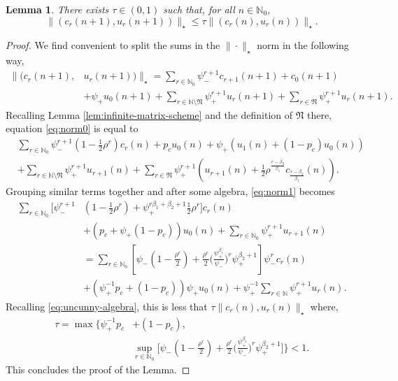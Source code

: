 \documentclass{amsart}
\numberwithin{equation}{section}
\newtheorem{lemma}[theorem]{Lemma}
\renewcommand{\le}{\leqslant}
\newcommand\bN{{\mathbb N}}
\begin{document}
\begin{lemma}\label{lem:contraction-strange-norm} There exists \(\tau \in (0,1)\) such that, for all \(n \in \bN_0\),
  \[
  \|(c_r(n+1), u_r(n+1))\|_{\star} \le \tau \|(c_r(n), u_r (n))\|_{\star}.
  \]
\end{lemma}
\begin{proof}
 We find convenient to split the sums in the \(\|\cdot\|_{\star}\) norm in the following way,
  \begin{equation}\label{eq:norm0}
\begin{split}
 \|(c_r(n+1),& u_r(n+1))\|_{\star} = \sum_{r \in \bN_0}\psi_-^{r+1} c_{r+1}(n+1) + c_0(n+1) \\
&+ \psi_+ u_0(n+1) + \sum_{r \in \bN \setminus \mathfrak N}\psi_+^{r+1}u_r(n+1) + \sum_{r \in \mathfrak N}\psi_+^{r+1}u_{r}(n+1).
\end{split}
\end{equation}
Recalling Lemma \ref{lem:infinite-matrix-scheme} and the definition of \(\mathfrak N\) there, equation \eqref{eq:norm0} is equal to
\begin{equation}\label{eq:norm1}
\begin{split}
&\sum_{r \in \bN_0}\psi_-^{r+1} \left(1- \frac 1 2\rho^{r}\right) c_r(n)  + p_c u_0(n) + \psi_+ \left( u_{1}(n) +(1-p_{c}) u_{0}(n) \right) \\
&+ \sum_{r \in \bN \setminus \mathfrak N}\psi_+^{r+1}u_{r+1}(n) + \sum_{r \in \mathfrak N}\psi_+^{r+1} \left(u_{r+1}(n) +  \frac 1 2\rho^{ \frac{r-\beta_2}{\beta_1}}c_{\frac{r-\beta_2}{\beta_1}}(n)\right).
\end{split}
\end{equation}
Grouping similar terms together and after some algebra, \eqref{eq:norm1} becomes
\begin{equation}
\begin{split}
\sum_{r \in \bN_0}\biggl[\psi_-^{r+1} &\left(1- \frac 1 2\rho^{r}\right)   + \psi_+^{r\beta_1 + \beta_2+1}  \frac 1 2\rho^{r} \biggr]c_r(n) \\
&+\left(p_c + \psi_+ (1-p_c)\right)u_0(n) + \sum_{r \in \bN_0}\psi_+^{r+1} u_{r+1}(n)\\
&\!\!\!\!\!\!\!\!\!\!\!\!\!\!\!\!\!\!\!\!\!\!\!\!\!\!\!\!\!\!\!\!\!=  \sum_{r \in \bN_0}\left[\psi_- \left(1-\frac{\rho^r}{2}\right) + \frac{\rho^r}{2}\biggl(\frac{\psi_{+}^{\beta_1}}{\psi_{-}} \biggr)^r \psi_{+}^{\beta_2 + 1}\right]\psi_{-}^r c_r(n)\\
& +\left(\psi_{+}^{-1}p_c +  (1-p_c)\right) \psi_+ u_0(n) + \psi_+^{-1}\sum_{r \in \bN}\psi_+^{r+1} u_{r}(n).
\end{split}
\end{equation}
Recalling \eqref{eq:uncunny-algebra}, this is less that \(\tau \|c_r(n), u_r(n)\|_{\star}\) where,
\[
\begin{split}
   \tau = \max \Biggl\{\psi_{+}^{-1}p_c &+  (1-p_c), \\
 &\sup_{r \in \bN_{0}}\biggl[\psi_- \left(1-\frac{\rho^r}{2}\right) + \frac{\rho^r}{2}\biggl(\frac{\psi_{+}^{\beta_1}}{\psi_{-}} \biggr)^r \psi_{+}^{\beta_2 + 1}\biggr]\Biggr\}<1.
\end{split}
\]
This concludes the proof of the Lemma.
\end{proof}
\end{document}

